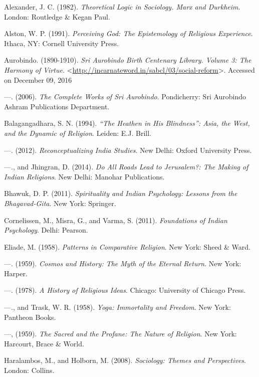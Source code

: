\begin{thebibliography}{99}
 Alexander, J. C. (1982). \textit{Theoretical Logic in Sociology. Marx and Durkheim}. London: Routledge \& Kegan Paul.

  Alston, W. P. (1991). \textit{Perceiving God: The Epistemology of Religious Experience}. Ithaca, NY: Cornell University Press.

  Aurobindo. (1890-1910). \textit{Sri Aurobindo Birth Centenary Library. Volume 3: The Harmony of Virtue.} \textless \url{http://incarnateword.in/sabcl/03/social-reform}\textgreater . Accessed on December 09, 2016

  —. (2006). \textit{The Complete Works of Sri Aurobindo}. Pondicherry: Sri Aurobindo Ashram Publications Department.

  Balagangadhara, S. N. (1994). \textit{“The Heathen in His Blindness”: Asia, the West, and the Dynamic of Religion}. Leiden: E.J. Brill.

  —. (2012). \textit{Reconceptualizing India Studies}. New Delhi: Oxford University Press.

  —., and Jhingran, D. (2014). \textit{Do All Roads Lead to Jerusalem?: The Making of Indian Religions}. New Delhi: Manohar Publications.

  Bhawuk, D. P. (2011). \textit{Spirituality and Indian Psychology: Lessons from the Bhagavad-Gita}. New York: Springer.

  Cornelissen, M., Misra, G., and Varma, S. (2011). \textit{Foundations of Indian Psychology}. Delhi: Pearson.

  Eliade, M. (1958). \textit{Patterns in Comparative Religion}. New York: Sheed \& Ward.

  —. (1959). \textit{Cosmos and History: The Myth of the Eternal Return}. New York: Harper.

  —. (1978). \textit{A History of Religious Ideas}. Chicago: University of Chicago Press.

  —., and Trask, W. R. (1958). \textit{Yoga: Immortality and Freedom}. New York: Pantheon Books.

  —, (1959). \textit{The Sacred and the Profane: The Nature of Religion}. New York: Harcourt, Brace \& World.

  Haralambos, M., and Holborn, M. (2008). \textit{Sociology: Themes and Perspectives}. London: Collins.


\end{thebibliography}
